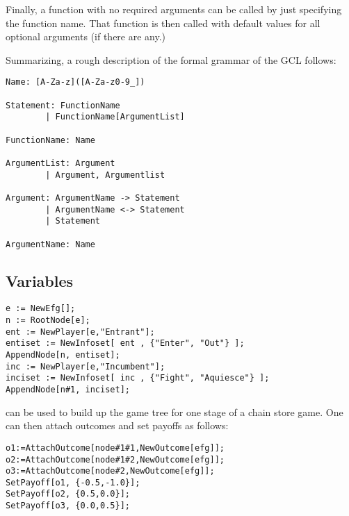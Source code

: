 Finally, a function with no required arguments can be called by just
specifying the function name.  That function is then called with
default values for all optional arguments (if there are any.)

Summarizing, a rough description of the formal grammar of the GCL
follows:

\begin{verbatim}
Name: [A-Za-z]([A-Za-z0-9_])

Statement: FunctionName
        | FunctionName[ArgumentList]

FunctionName: Name

ArgumentList: Argument
        | Argument, Argumentlist

Argument: ArgumentName -> Statement
        | ArgumentName <-> Statement
        | Statement

ArgumentName: Name
\end{verbatim}

\subsection{Variables}




\begin{verbatim}
e := NewEfg[];
n := RootNode[e];
ent := NewPlayer[e,"Entrant"];
entiset := NewInfoset[ ent , {"Enter", "Out"} ];
AppendNode[n, entiset];
inc := NewPlayer[e,"Incumbent"];
inciset := NewInfoset[ inc , {"Fight", "Aquiesce"} ];
AppendNode[n#1, inciset]; 
\end{verbatim}

can be used to build up the game tree for one stage of a chain store
game.  One can then attach outcomes and set payoffs as follows:

\begin{verbatim}
o1:=AttachOutcome[node#1#1,NewOutcome[efg]];
o2:=AttachOutcome[node#1#2,NewOutcome[efg]];
o3:=AttachOutcome[node#2,NewOutcome[efg]];
SetPayoff[o1, {-0.5,-1.0}];
SetPayoff[o2, {0.5,0.0}];
SetPayoff[o3, {0.0,0.5}];
\end{verbatim}

